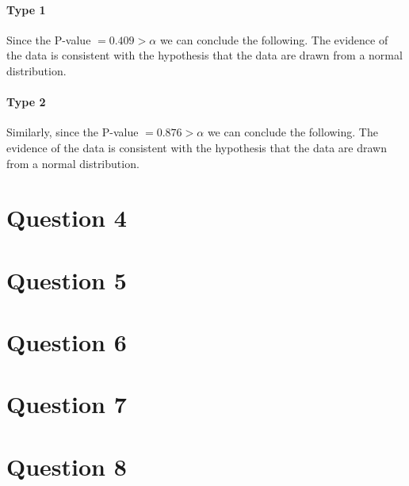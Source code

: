 \documentclass{article}
\begin{document}
\paragraph{Type 1} Since the P-value $= 0.409 > \alpha$ we can conclude the following.
    The evidence of the data is consistent with the hypothesis that the data are drawn from a normal distribution.

\paragraph{Type 2} Similarly, since the P-value $= 0.876 > \alpha$ we can conclude the following.
    The evidence of the data is consistent with the hypothesis that the data are drawn from a normal distribution.
\section*{Question 4}

\section*{Question 5}

\section*{Question 6}

\section*{Question 7}

\section*{Question 8}
\end{document}

